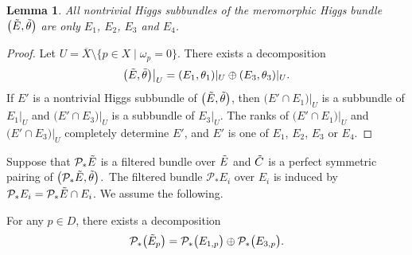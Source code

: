 \documentclass[pdftex]{sigma}
\numberwithin{equation}{section}
\newtheorem{Lemma}[Theorem]{Lemma}
\begin{document}
\begin{Lemma}
 All nontrivial Higgs subbundles of the meromorphic Higgs bundle $\bigl(\Tilde{E},\Tilde{\theta}\bigr)$ are only $E_1$, $E_2$, $E_3$ and $E_4$.
\end{Lemma}
\begin{proof}
 Let $U= \overline{X}\setminus \{p\in X\mid \omega_p=0 \}$. There exists a decomposition
 \begin{equation*}
 \bigl(\Tilde{E},\Tilde{\theta}\bigr)\big|_{U} = (E_1,\theta_1)|_{U}\oplus (E_3,\theta_3)|_{U}.
 \end{equation*}
 If $E'$ is a nontrivial Higgs subbundle of $\bigl(\Tilde{E},\Tilde{\theta}\bigr)$, then $\bigl(E'\cap E_1\bigr)|_{U}$ is a subbundle of $E_1|_{U}$ and $\bigl(E'\cap E_3\bigr)|_{U}$ is a subbundle of $E_3|_{U}$. The ranks of $\bigl(E'\cap E_1\bigr)|_{U}$ and $\bigl(E'\cap E_3\bigr)|_{U}$ completely determine $E'$, and $E'$ is one of $E_1$, $E_2$, $E_3$ or $E_4$.
\end{proof}

Suppose that $\mathcal{P}_*\Tilde{E}$ is a filtered bundle over $\Tilde{E}$ and $\Tilde{C}$ is a perfect symmetric pairing of $\bigl(\mathcal{P}_*\Tilde{E},\Tilde{\theta}\bigr)$.~The filtered bundle $\mathcal{P}_*E_i$ over $E_i$ is induced by $\mathcal{P}_*E_i = \mathcal{P}_*\Tilde{E} \cap E_i$. We assume the following.
\begin{Assumption}\label{assump}
 For any $p\in D$, there exists a decomposition
 \begin{equation*}
 \mathcal{P}_*\bigl(\Tilde{E}_p\bigr) = \mathcal{P}_*\bigl(E_{1,p}\bigr) \oplus \mathcal{P}_*\bigl(E_{3,p}\bigr).
 \end{equation*}
\end{Assumption}
\end{document}
